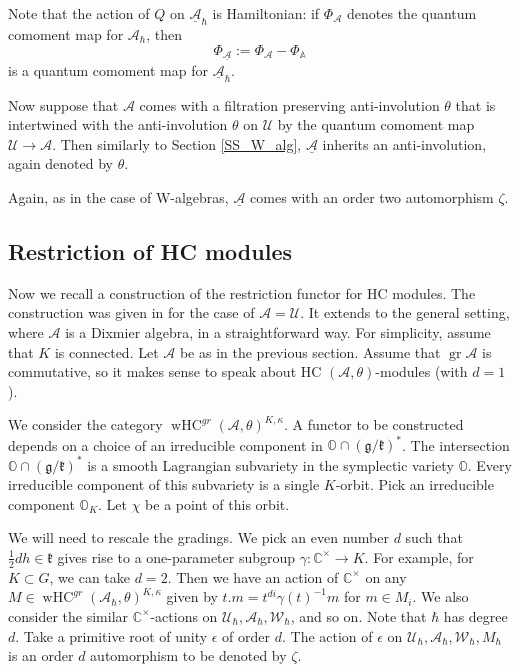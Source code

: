 \documentclass[12pt]{amsart}
\newcommand{\C}{\mathbb{C}}
\newcommand{\A}{\mathcal{A}}
\newcommand{\U}{\mathcal{U}}
\newcommand{\g}{\mathfrak{g}}
\newcommand{\Orb}{\mathbb{O}}
\newcommand{\Walg}{\mathcal{W}}
\newcommand{\gr}{\operatorname{gr}}
\newcommand{\kf}{\mathfrak{k}}
\newcommand{\wHC}{\operatorname{wHC}}
\newcommand{\Weyl}{\mathbb{A}}
\theoremstyle{definition}
\numberwithin{equation}{section}
\begin{document}
Note that the action of $Q$ on $\underline{\A}_\hbar$ is Hamiltonian: if $\Phi_{\A}$
denotes the quantum comoment map for $\A_\hbar$, then
\begin{equation}\label{eq:q_comom_A}
\Phi_{\underline{\A}}:=\Phi_{\A}-\Phi_{\Weyl}
\end{equation}
is a quantum comoment map for $\underline{\A}_\hbar$.

Now suppose that $\A$ comes with a filtration preserving anti-involution
$\theta$ that is intertwined with the anti-involution $\theta$ on $\U$
by the quantum comoment map $\U\rightarrow\A$.
Then similarly to Section \ref{SS_W_alg}, $\underline{\A}$ inherits an
anti-involution, again denoted by $\theta$.

Again, as in the case of W-algebras, $\underline{\A}$ comes with an order two
automorphism $\zeta$.

\subsection{Restriction of HC modules}\label{SS:HC_mod_restr}
Now we recall a construction of the restriction functor for HC modules.
The construction was given in \cite[Section 6.1]{Wdim} for the case of
$\A=\U$. It extends to the general setting, where $\A$ is a Dixmier algebra, in a straightforward way.
For simplicity, assume that $K$ is connected. Let $\A$ be as in the previous section.
Assume that $\gr\A$ is commutative, so
it makes sense to speak about HC $(\A,\theta)$-modules (with $d=1$).

We consider the category $\wHC^{gr}(\A,\theta)^{K,\kappa}$. A functor to be constructed depends on a choice of an irreducible component in $\Orb\cap (\g/\kf)^*$.
The intersection  $\Orb\cap (\g/\kf)^*$ is a smooth Lagrangian subvariety in
the symplectic variety $\Orb$. Every irreducible component of this subvariety is
a single $K$-orbit. Pick an irreducible component $\Orb_K$. Let $\chi$ be a point of
this orbit.

We will need to rescale the gradings.
We pick an even number $d$ such that $\frac{1}{2}dh\in \kf$ gives rise to
a one-parameter subgroup $\gamma:\C^\times\rightarrow K$. For example, for $K\subset G$,
we can take $d=2$. Then we have an action of $\C^\times$ on any $M\in \wHC^{gr}(\A_\hbar,\theta)^{K,\kappa}$
given by $t.m=t^{di}\gamma(t)^{-1}m$ for $m\in M_i$. We also consider the similar $\C^\times$-actions
on $\U_\hbar,\A_\hbar,\Walg_\hbar$, and so on. Note that $\hbar$ has degree $d$. Take a primitive root of unity $\epsilon$ of order $d$. The action of $\epsilon$ on $\U_\hbar,\A_\hbar,\Walg_\hbar, M_\hbar$
is an order $d$ automorphism to be denoted by $\zeta$.
\end{document}
